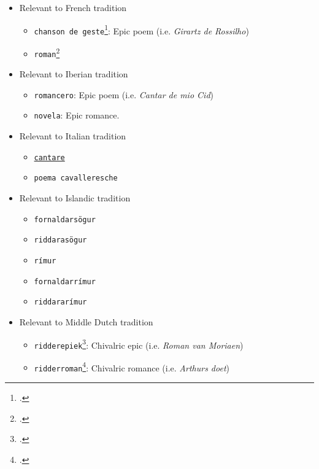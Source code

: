 \begin{itemize}
        \begin{itemize}
            \item Relevant to French tradition
                \begin{itemize}
                    \item \texttt{chanson de geste}\footcite[][]{Comfort1904}: Epic poem (i.e. \textit{Girartz de Rossilho})
                    \item \texttt{roman}\footcite[][]{Comfort1904}
                \end{itemize}
            \item Relevant to Iberian tradition
            \begin{itemize}
                \item \texttt{romancero}: Epic poem (i.e. \textit{Cantar de mio Cid})
                \item \texttt{novela}: Epic romance.
            \end{itemize}
            \item Relevant to Italian tradition
            \begin{itemize}
                \item \href{https://www.oxfordbibliographies.com/display/document/obo-9780195396584/obo-9780195396584-0199.xml}{\texttt{cantare}}
                \item \texttt{poema cavalleresche}
            \end{itemize}
            \item Relevant to Islandic tradition
                \begin{itemize}
                    \item \texttt{fornaldarsögur}
                    \item \texttt{riddarasögur}
                    \item \texttt{rímur}
                    \item \texttt{fornaldarrímur}
                    \item \texttt{riddararímur}
                \end{itemize}
            \item Relevant to Middle Dutch tradition
                \begin{itemize}
                    \item \texttt{ridderepiek}\footcite[][]{Besamusca2011}: Chivalric epic (i.e. \textit{Roman van Moriaen})
                    \item \texttt{ridderroman}\footcite[][]{Oostrom2005}: Chivalric romance (i.e. \textit{Arthurs doet})

\end{itemize}
\end{itemize}
\end{itemize}
